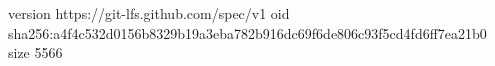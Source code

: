 version https://git-lfs.github.com/spec/v1
oid sha256:a4f4c532d0156b8329b19a3eba782b916dc69f6de806c93f5cd4fd6ff7ea21b0
size 5566
